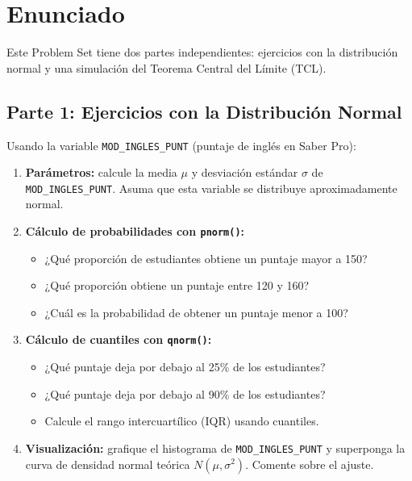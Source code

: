 \documentclass[11pt, a4paper]{article}
\begin{document}
\section*{Enunciado}

Este Problem Set tiene dos partes independientes: ejercicios con la distribuci\'on
normal y una simulaci\'on del Teorema Central del L\'imite (TCL).

\subsection*{Parte 1: Ejercicios con la Distribuci\'on Normal}

Usando la variable \texttt{MOD\_INGLES\_PUNT} (puntaje de ingl\'es en Saber Pro):

\begin{enumerate}[label=\alph*)]
  \item \textbf{Par\'ametros:} calcule la media $\mu$ y desviaci\'on est\'andar
        $\sigma$ de \texttt{MOD\_INGLES\_PUNT}. Asuma que esta variable se distribuye
        aproximadamente normal.

  \item \textbf{C\'alculo de probabilidades con \texttt{pnorm()}:}
        \begin{itemize}
          \item ¿Qu\'e proporci\'on de estudiantes obtiene un puntaje mayor a 150?
          \item ¿Qu\'e proporci\'on obtiene un puntaje entre 120 y 160?
          \item ¿Cu\'al es la probabilidad de obtener un puntaje menor a 100?
        \end{itemize}

  \item \textbf{C\'alculo de cuantiles con \texttt{qnorm()}:}
        \begin{itemize}
          \item ¿Qu\'e puntaje deja por debajo al 25\% de los estudiantes?
          \item ¿Qu\'e puntaje deja por debajo al 90\% de los estudiantes?
          \item Calcule el rango intercuart\'ilico (IQR) usando cuantiles.
        \end{itemize}

  \item \textbf{Visualizaci\'on:} grafique el histograma de \texttt{MOD\_INGLES\_PUNT}
        y superponga la curva de densidad normal te\'orica $N(\mu, \sigma^2)$.
        Comente sobre el ajuste.
\end{enumerate}
\end{document}
